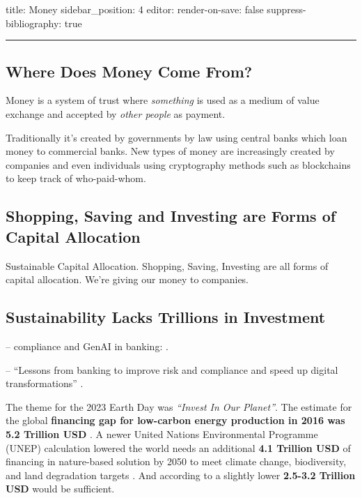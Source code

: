 \documentclass[
  letterpaper,
  DIV=11,
  numbers=noendperiod]{scrartcl}
\begin{document}
title: Money sidebar\_position: 4 editor: render-on-save: false
suppress-bibliography: true

\begin{center}\rule{0.5\linewidth}{0.5pt}\end{center}

\subsection{Where Does Money Come
From?}\label{where-does-money-come-from}

Money is a system of trust where \emph{something} is used as a medium of
value exchange and accepted by \emph{other people} as payment.

Traditionally it's created by governments by law using central banks
which loan money to commercial banks. New types of money are
increasingly created by companies and even individuals using
cryptography methods such as blockchains to keep track of who-paid-whom.

\subsection{Shopping, Saving and Investing are Forms of Capital
Allocation}\label{shopping-saving-and-investing-are-forms-of-capital-allocation}

Sustainable Capital Allocation. Shopping, Saving, Investing are all
forms of capital allocation. We're giving our money to companies.

\subsection{Sustainability Lacks Trillions in
Investment}\label{sustainability-lacks-trillions-in-investment}

-- compliance and GenAI in banking:
\citep{rahulagarwalHowGenerativeAI2024}.

-- ``Lessons from banking to improve risk and compliance and speed up
digital transformations'' \citep{jimboehmBetterRiskControls2021}.

The theme for the 2023 Earth Day was \emph{``Invest In Our Planet''}.
The estimate for the global \textbf{financing gap for low-carbon energy
production in 2016 was 5.2 Trillion USD}
\citep{MappingGapRoad2016, earthdayEarthDay20232023}. A newer United
Nations Environmental Programme (UNEP) calculation lowered the world
needs an additional \textbf{4.1 Trillion USD} of financing in
nature-based solution by 2050 to meet climate change, biodiversity, and
land degradation targets \citep{unepUNEPGreenFinance2022}. And according
to \citep{therockefellerfoundationWhatGetsMeasured2022} a slightly lower
\textbf{2.5-3.2 Trillion USD} would be sufficient.
\end{document}
